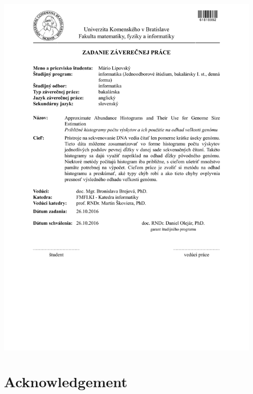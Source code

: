 \documentclass[12pt, oneside]{book}
\begin{document}
\newpage 
\thispagestyle{empty}
\hspace{-3.5cm}\includegraphics[width=1.3\textwidth]{images/zadanie-sj}


\frontmatter

\setcounter{page}{3}
\newpage 
\chapter*{Acknowledgement}



\newpage 
\end{document}
